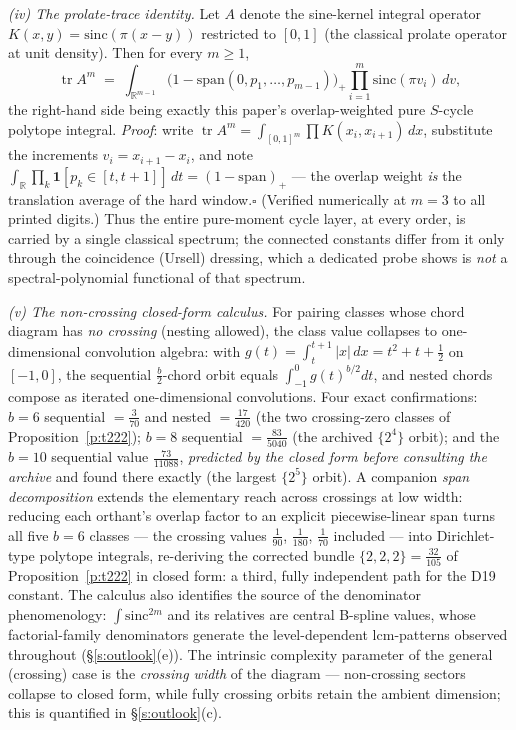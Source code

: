 \documentclass[11pt]{article}
\numberwithin{equation}{section}
\theoremstyle{definition}
\theoremstyle{remark}
\begin{document}
\emph{(iv) The prolate-trace identity.} Let $A$ denote the
sine-kernel integral operator $K(x,y)=\mathrm{sinc}(\pi(x-y))$
restricted to $[0,1]$ (the classical prolate operator at unit
density). Then for every $m\ge1$,
\[
\operatorname{tr}A^{m}
\;=\;\int_{\mathbb R^{m-1}}
\bigl(1-\mathrm{span}(0,p_1,\dots,p_{m-1})\bigr)_+
\prod_{i=1}^{m}\mathrm{sinc}(\pi v_i)\,dv ,
\]
the right-hand side being exactly this paper's overlap-weighted
pure $S$-cycle polytope integral. \emph{Proof}: write
$\operatorname{tr}A^m=\int_{[0,1]^m}\prod
K(x_i,x_{i+1})\,dx$, substitute the increments
$v_i=x_{i+1}-x_i$, and note
$\int_{\mathbb R}\prod_k\mathbf 1[p_k\in[t,t+1]]\,dt
=(1-\mathrm{span})_+$ --- the overlap weight \emph{is} the
translation average of the hard window.\;$\square$
(Verified numerically at $m=3$ to all printed digits.) Thus
the entire pure-moment cycle layer, at every order, is carried
by a single classical spectrum; the connected constants differ
from it only through the coincidence (Ursell) dressing, which
a dedicated probe shows is \emph{not} a spectral-polynomial
functional of that spectrum.

\emph{(v) The non-crossing closed-form calculus.} For pairing
classes whose chord diagram has \emph{no crossing} (nesting
allowed), the class value collapses to one-dimensional
convolution algebra: with
$g(t)=\int_t^{t+1}|x|\,dx=t^2+t+\tfrac12$ on $[-1,0]$, the
sequential $\tfrac b2$-chord orbit equals
$\int_{-1}^{0}g(t)^{b/2}dt$, and nested chords compose as
iterated one-dimensional convolutions. Four exact
confirmations: $b=6$ sequential $=\tfrac3{70}$ and nested
$=\tfrac{17}{420}$ (the two crossing-zero classes of
Proposition~\ref{p:t222}); $b=8$ sequential $=\tfrac{83}{5040}$
(the archived $\{2^4\}$ orbit); and the $b=10$ sequential value
$\tfrac{73}{11088}$, \emph{predicted by the closed form before
consulting the archive} and found there exactly (the largest
$\{2^5\}$ orbit). A companion \emph{span decomposition} extends
the elementary reach across crossings at low width: reducing
each orthant's overlap factor to an explicit piecewise-linear
span turns all five $b=6$ classes --- the crossing values
$\tfrac1{90}$, $\tfrac1{180}$, $\tfrac1{70}$ included --- into
Dirichlet-type polytope integrals, re-deriving the corrected
bundle $\{2,2,2\}=\tfrac{32}{105}$ of
Proposition~\ref{p:t222} in closed form: a third, fully
independent path for the D19 constant. The calculus also identifies the source of
the denominator phenomenology: $\int\mathrm{sinc}^{2m}$ and its
relatives are central B-spline values, whose factorial-family
denominators generate the level-dependent
$\mathrm{lcm}$-patterns observed throughout
(\S\ref{s:outlook}(e)). The intrinsic complexity parameter of
the general (crossing) case is the \emph{crossing width} of the
diagram --- non-crossing sectors collapse to closed form, while
fully crossing orbits retain the ambient dimension; this is
quantified in \S\ref{s:outlook}(c).
\end{document}
